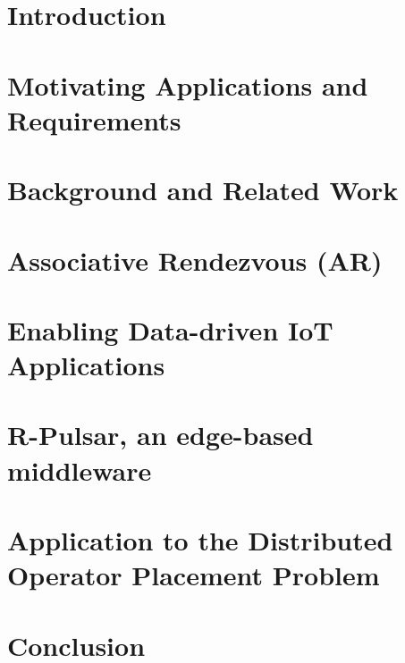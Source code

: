 \documentclass{ruthesis}
\begin{document}
\beforepreface
{}
\dedication{The body of the dedication}
\afterpreface

\listoftables
\listoffigures

\chapter{Introduction}

\chapter{Motivating Applications and Requirements} \label{chap:applications}

\chapter{Background and Related Work}

\chapter{Associative Rendezvous (AR)} \label{chap:AR}

\chapter{Enabling Data-driven IoT Applications}

\chapter{R-Pulsar, an edge-based middleware}

\chapter{Application to the Distributed Operator Placement Problem}

\chapter{Conclusion}





\end{document}
